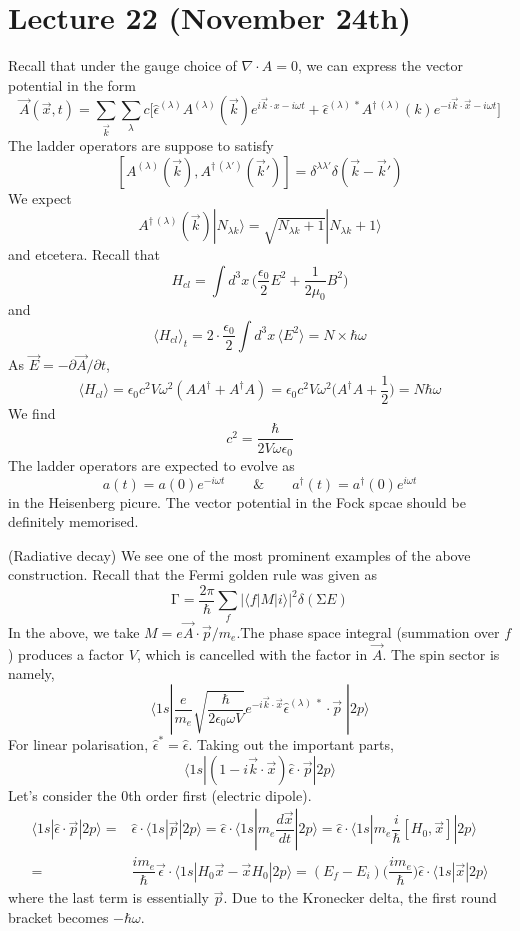 \section{Lecture 22 (November 24th)}
\begin{defi}
Recall that under the gauge choice of $\nabla \cdot A=0$, we can express the vector potential in the form
\[\vec{A}(\vec{x},t)=\sum _{\vec{k}}\sum _{\lambda }c \Big[\hat{\epsilon }^{(\lambda )}A^{(\lambda )}(\vec{k})e^{i\vec{k}\cdot x-i\omega t}+\hat{\epsilon }^{(\lambda )\,*}A^{\dagger \,(\lambda )}(k)e^{-i\vec{k}\cdot \vec{x}-i\omega t}\Big]\]
The ladder operators are suppose to satisfy
\[[A^{(\lambda )}(\vec{k}),A^{\dagger \,(\lambda ')}(\vec{k}')]=\delta ^{\lambda \lambda '}\delta (\vec{k}-\vec{k}')\]
We expect
\[A^{\dagger \,(\lambda )}(\vec{k})|N_{\lambda k}\rangle =\sqrt{N_{\lambda k}+1}|N_{\lambda k}+1\rangle \]
and etcetera. Recall that 
\[H_{cl}=\int d^3x\, \Big(\dfrac{\epsilon_0}{2}E^2+\dfrac{1}{2\mu_0}B^2\Big)\]
and
\[\langle H_{cl}\rangle _{t}=2\cdot \dfrac{\epsilon_0}{2}\int d^3x\, \langle E^2\rangle =  N\times \hbar \omega \]
As $\vec{E}=-\partial \vec{A}/\partial t$, 
\[\langle H_{cl}\rangle =\epsilon_0c^2V\omega ^2(AA^{\dagger }+A^{\dagger }A)=\epsilon_0c^2V\omega ^2\Big(A^{\dagger }A+\dfrac{1}{2}\Big)=N\hbar \omega \]
We find
\[c^2=\dfrac{\hbar }{2V\omega \epsilon_0}\]
The ladder operators are expected to evolve as
\[a(t)=a(0)e^{-i\omega t}\qquad\&\qquad a^{\dagger }(t)=a^{\dagger }(0)e^{i\omega t}\]
in the Heisenberg picure. The vector potential in the Fock spcae should be definitely memorised. 
\end{defi}
\vspace{2ex}
\begin{defi}
(Radiative decay) We see one of the most prominent examples of the above construction. Recall that the Fermi golden rule was given as
\[\mathrm{\Gamma} =\dfrac{2\pi }{\hbar }\sum _{f}|\langle f|M|i\rangle |^2\delta (\mathrm{\Sigma}  E)\]
In the above, we take $M=e\vec{A}\cdot \vec{p}/m_{e}$.The phase space integral (summation over $f$) produces a factor $V$, which is cancelled with the factor in $\vec{A}$. The spin sector is namely,
\[\langle 1s|\dfrac{e}{m_{e}}\sqrt{\dfrac{\hbar }{2\epsilon_0\omega V}}e^{-i\vec{k}\cdot \vec{x}}\hat{\epsilon }^{(\lambda )\;*}\cdot \vec{p}\;|2p\rangle \]
For linear polarisation, $\hat{\epsilon }^{*}=\hat{\epsilon }$. Taking out the important parts,
\[\langle 1s|(1-i\vec{k}\cdot \vec{x})\hat{\epsilon }\cdot \vec{p}|2p\rangle\]
Let's consider the 0th order first (electric dipole).
\[\begin{align*}
\langle 1s|\hat{\epsilon }\cdot \vec{p}|2p\rangle =&\hat{\epsilon }\cdot \langle 1s|\vec{p}|2p\rangle =\hat{\epsilon }\cdot \langle 1s|m_{e}\dfrac{d \vec{x}}{d t}|2p\rangle =\hat{\epsilon } \cdot \langle 1s|m_{e}\dfrac{i}{\hbar }[H_0,\vec{x}]|2p\rangle \\
=&\dfrac{im_{e}}{\hbar }\vec{\epsilon }\cdot \langle 1s|H_0\vec{x}-\vec{x}H_0|2p\rangle =(E_{f}-E_{i})\Big(\dfrac{im_{e}}{\hbar }\Big)\hat{\epsilon }\cdot \langle 1s|\vec{x}|2p\rangle 
\end{align*}\]
where the last term is essentially $\vec{p}$. Due to the Kronecker delta, the first round bracket becomes $-\hbar \omega $. 
\end{defi}
\vspace{2ex}

